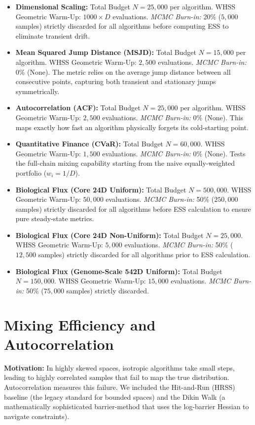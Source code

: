 \documentclass[12pt]{article}
\begin{document}
\begin{itemize}
    \item \textbf{Dimensional Scaling:} Total Budget $N=25{,}000$ per algorithm. WHSS Geometric Warm-Up: $1000 \times D$ evaluations. \emph{MCMC Burn-in:} 20\% ($5{,}000$ samples) strictly discarded for all algorithms before computing ESS to eliminate transient drift.
    \item \textbf{Mean Squared Jump Distance (MSJD):} Total Budget $N=15{,}000$ per algorithm. WHSS Geometric Warm-Up: $2{,}500$ evaluations. \emph{MCMC Burn-in:} 0\% (None). The metric relies on the average jump distance between all consecutive points, capturing both transient and stationary jumps symmetrically.
    \item \textbf{Autocorrelation (ACF):} Total Budget $N=25{,}000$ per algorithm. WHSS Geometric Warm-Up: $2{,}500$ evaluations. \emph{MCMC Burn-in:} 0\% (None). This maps exactly how fast an algorithm physically forgets its cold-starting point.
    \item \textbf{Quantitative Finance (CVaR):} Total Budget $N=60{,}000$. WHSS Geometric Warm-Up: $1{,}500$ evaluations. \emph{MCMC Burn-in:} 0\% (None). Tests the full-chain mixing capability starting from the naive equally-weighted portfolio ($w_i = 1/D$).
    \item \textbf{Biological Flux (Core 24D Uniform):} Total Budget $N=500{,}000$. WHSS Geometric Warm-Up: $50{,}000$ evaluations. \emph{MCMC Burn-in:} 50\% ($250{,}000$ samples) strictly discarded for all algorithms before ESS calculation to ensure pure steady-state metrics.
    \item \textbf{Biological Flux (Core 24D Non-Uniform):} Total Budget $N=25{,}000$. WHSS Geometric Warm-Up: $5{,}000$ evaluations. \emph{MCMC Burn-in:} 50\% ($12{,}500$ samples) strictly discarded for all algorithms prior to ESS calculation.
    \item \textbf{Biological Flux (Genome-Scale 542D Uniform):} Total Budget $N=150{,}000$. WHSS Geometric Warm-Up: $15{,}000$ evaluations. \emph{MCMC Burn-in:} 50\% ($75{,}000$ samples) strictly discarded.
\end{itemize}

\section{Mixing Efficiency and Autocorrelation}
\textbf{Motivation:} In highly skewed spaces, isotropic algorithms take small steps, leading to highly correlated samples that fail to map the true distribution. Autocorrelation measures this failure. We included the Hit-and-Run (HRSS) baseline (the legacy standard for bounded spaces) and the Dikin Walk (a mathematically sophisticated barrier-method that uses the log-barrier Hessian to navigate constraints). 
\end{document}
